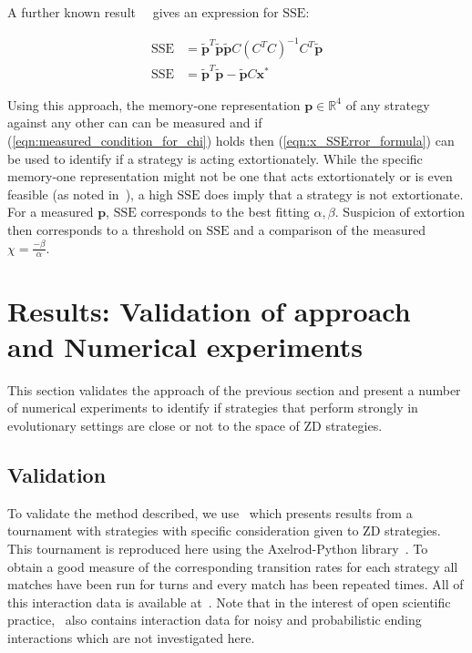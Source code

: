 \documentclass[a4paper]{article}
\newcommand{\SSe}{\text{SSE}}
\begin{document}
A further known result~~\cite{kutner2004applied, rao1973linear,
wakefield2013bayesian} gives an expression for
\(\SSe\):

\begin{align}\label{eqn:x_SSError_formula}
    \SSe &= {\tilde{\textbf{p}}} ^ T \tilde{\textbf{p}}
           \tilde{\textbf{p}} C \left(C ^ T C \right) ^ {-1} C ^ T
           \tilde{\textbf{p}} \\
    \SSe &={\tilde{\textbf{p}}} ^ T \tilde{\textbf{p}} - \tilde{\textbf{p}} C \textbf{x}^*
\end{align}

Using this approach, the memory-one representation \(\textbf{p}\in\mathbb{R}^4\) of any
strategy against any other can can be measured and if
(\ref{eqn:measured_condition_for_chi}) holds then (\ref{eqn:x_SSError_formula})
can be used to identify if a strategy is acting extortionately. While the
specific memory-one representation might not be one that acts extortionately or
is even feasible (as noted in~\cite{Press2012}), a
high \(\SSe\) does imply that a strategy is not extortionate. For a measured
\(\textbf{p}\), \(\SSe\) corresponds to the best fitting \(\alpha, \beta\). Suspicion of
extortion then corresponds to a threshold on \(\SSe\) and a comparison of the
measured \(\chi=\frac{-\beta}{\alpha}\).

\section{Results: Validation of approach and Numerical experiments}\label{sec:numerical-experiments}

This section validates the approach of the previous section and
present a number of numerical experiments to identify if strategies that perform
strongly in evolutionary settings are close or not to the space of
ZD strategies.

\subsection{Validation}

To validate the method described, we use~\cite{Stewart2012} which
presents results from a tournament with
strategies
with specific consideration given to ZD strategies. This
tournament is reproduced here using the Axelrod-Python
library~\cite{Knight2016}. To obtain a good measure of the corresponding
transition rates for each strategy all matches have been run for
turns and every match has been
repeated times. All of this
interaction data is available at~\cite{vincent_knight_2018_1297075}. Note that
in the interest of open scientific practice,~\cite{vincent_knight_2018_1297075}
also contains interaction data for noisy and probabilistic ending interactions
which are not investigated here.
\end{document}
